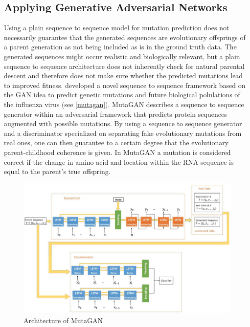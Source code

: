 \subsection{Applying Generative Adversarial Networks} \label{fundamentalsF}

Using a plain sequence to sequence model for mutation prediction does not necessarily guarantee that the generated sequences are evolutionary offsprings of a parent generation as not being included as is in the ground truth data. The generated sequences might occur realistic and biologically relevant, but a plain sequence to sequence architecture does not inherently check for natural parental descent and therefore does not make sure whether the predicted mutations lead to improved fitness. \cite{Berman2020} developed a novel sequence to sequence framework based on the \ac{GAN} idea to predict genetic mutations and future biological polulations of the influenza virus (see \autoref{mutagan}). MutaGAN describes a sequence to sequence generator within an adversarial framework that predicts protein sequences augmented with possible mutations. By using a sequence to sequence generator and a discriminator specialized on separating fake evolutionary mutations from real ones, one can then guarantee to a certain degree that the evolutionary parent-childhood coherence is given. In MutaGAN a mutation is considered correct if the change in amino acid and location within the \ac{RNA} sequence is equal to the parent's true offspring.  \cite{Berman2020}

\begin{figure}[ht]
	\centering
	\includegraphics[width=\linewidth]{figures/mutagan.png}
	\caption{Architecture of MutaGAN \cite{Berman2020}}
	\label{mutagan}
\end{figure}

